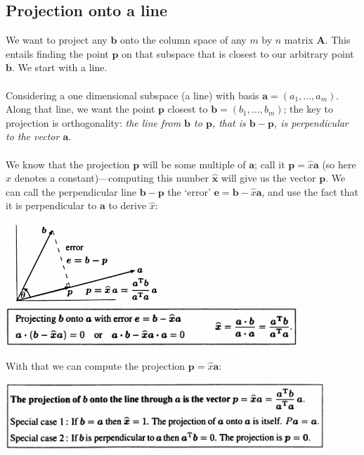 \documentclass{report}
\begin{document}
\subsection{Projection onto a line}
We want to project any $\bm b$ onto the column space of any $m$ by $n$ matrix $\bm A$. This entails finding the point $\bm p$ on that subspace that is closest to our
arbitrary point $\bm b$. We start with a line.\\
\vspace{1mm}\\
Considering a one dimensional subspace (a line) with basis $\bm a=(a_1,\ldots,a_m)$. 
Along that line, we want the point $\bm p$ closest to $\bm b=(b_1,\ldots,b_m)$; the key to projection is orthogonality: \textit{the line from $\bm b$ to $\bm p$, 
that is $\bm b-\bm p$, is perpendicular to the vector $\bm a$}.\\
\vspace{1mm}\\
We know that the projection $\bm p$ will be some multiple of $\bm a$; call it $\bm p=\hat{x}\bm a$ (so here $\hat{x}$ denotes a constant)---computing this number 
$\hat{\bm x}$ will give us the vector $\bm p$. We can call the perpendicular line $\bm b-\bm p$ the `error' $\bm e=\bm b-\hat{x}\bm a$, and use the fact that it is 
perpendicular to $\bm a$ to derive $\hat{x}$:
\begin{center}
\includegraphics[width=6cm]{54}\\
\includegraphics[width=11cm]{55}
\end{center}
With that we can compute the projection $\bm p=\hat{x}\bm a$:
\begin{center}
\includegraphics[width=12cm]{56}
\end{center}
\end{document}
